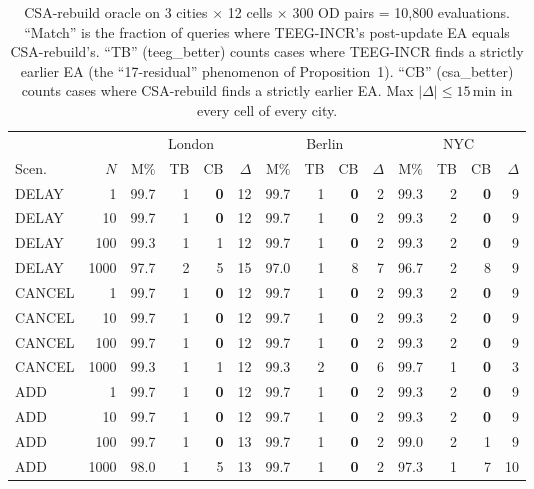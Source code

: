 \documentclass[letterpaper]{article}
\begin{document}
\begin{table}[H]
\centering
\caption{CSA-rebuild oracle on 3 cities $\times$ 12 cells $\times$ 300 OD
pairs = 10{,}800 evaluations. ``Match'' is the fraction of queries where
TEEG-INCR's post-update EA equals CSA-rebuild's. ``TB'' (teeg\_better)
counts cases where TEEG-INCR finds a strictly earlier EA (the
``17-residual'' phenomenon of Proposition~1). ``CB'' (csa\_better)
counts cases where CSA-rebuild finds a strictly earlier EA. Max
$|\Delta| \leq 15$\,min in every cell of every city.}
\label{tab:rebuild-oracle}
\scriptsize
\begin{tabular}{lr|rrrr|rrrr|rrrr}
\toprule
& & \multicolumn{4}{c|}{London} & \multicolumn{4}{c|}{Berlin} & \multicolumn{4}{c}{NYC} \\
Scen.\ & $N$ & M\% & TB & CB & $\Delta$ & M\% & TB & CB & $\Delta$ & M\% & TB & CB & $\Delta$ \\
\midrule
DELAY  & 1    & 99.7 & 1 & \textbf{0} & 12 & 99.7 & 1 & \textbf{0} & 2 & 99.3 & 2 & \textbf{0} & 9 \\
DELAY  & 10   & 99.7 & 1 & \textbf{0} & 12 & 99.7 & 1 & \textbf{0} & 2 & 99.3 & 2 & \textbf{0} & 9 \\
DELAY  & 100  & 99.3 & 1 & 1 & 12 & 99.7 & 1 & \textbf{0} & 2 & 99.3 & 2 & \textbf{0} & 9 \\
DELAY  & 1000 & 97.7 & 2 & 5 & 15 & 97.0 & 1 & 8 & 7 & 96.7 & 2 & 8 & 9 \\
CANCEL & 1    & 99.7 & 1 & \textbf{0} & 12 & 99.7 & 1 & \textbf{0} & 2 & 99.3 & 2 & \textbf{0} & 9 \\
CANCEL & 10   & 99.7 & 1 & \textbf{0} & 12 & 99.7 & 1 & \textbf{0} & 2 & 99.3 & 2 & \textbf{0} & 9 \\
CANCEL & 100  & 99.7 & 1 & \textbf{0} & 12 & 99.7 & 1 & \textbf{0} & 2 & 99.3 & 2 & \textbf{0} & 9 \\
CANCEL & 1000 & 99.3 & 1 & 1 & 12 & 99.3 & 2 & \textbf{0} & 6 & 99.7 & 1 & \textbf{0} & 3 \\
ADD    & 1    & 99.7 & 1 & \textbf{0} & 12 & 99.7 & 1 & \textbf{0} & 2 & 99.3 & 2 & \textbf{0} & 9 \\
ADD    & 10   & 99.7 & 1 & \textbf{0} & 12 & 99.7 & 1 & \textbf{0} & 2 & 99.3 & 2 & \textbf{0} & 9 \\
ADD    & 100  & 99.7 & 1 & \textbf{0} & 13 & 99.7 & 1 & \textbf{0} & 2 & 99.0 & 2 & 1 & 9 \\
ADD    & 1000 & 98.0 & 1 & 5 & 13 & 99.7 & 1 & \textbf{0} & 2 & 97.3 & 1 & 7 & 10 \\
\bottomrule
\end{tabular}
\end{table}
\end{document}
